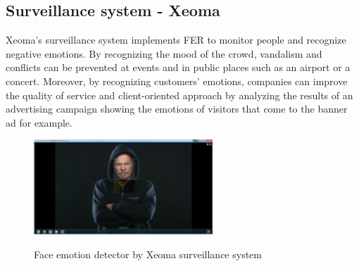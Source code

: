 \documentclass[12pt,a4paper,oneside,english]{book}
\begin{document}
\subsection{Surveillance system - Xeoma}
Xeoma’s surveillance system implements FER to monitor people and recognize negative emotions.
By recognizing the mood of the crowd, vandalism and conflicts can be prevented at events and in public places such as an airport or a concert.
Moreover, by recognizing customers’ emotions, companies can improve the quality of service and client-oriented approach by analyzing the results of an advertising campaign showing the emotions of visitors that come to the banner ad for example.
\begin{figure}[H]
    \centering
    \includegraphics[width=0.6\textwidth]{figures/State of art/xeoma.PNG}
    \caption{Face emotion detector by Xeoma surveillance system}
    \label{fig:xeoma}
    \cite{xeoma}
\end{figure}
\end{document}
